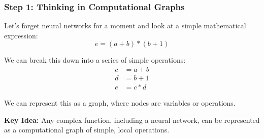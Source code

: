 \documentclass[xcolor=svgnames, 10pt, handout]{beamer}
\begin{document}
\begin{frame}
\frametitle{Step 1: Thinking in Computational Graphs}

Let's forget neural networks for a moment and look at a simple mathematical expression:
\begin{equation*}
    e = (a+b) * (b+1)
\end{equation*}

We can break this down into a series of simple operations:
\begin{align*}
    c &= a+b \\
    d &= b+1 \\
    e &= c * d
\end{align*}

We can represent this as a graph, where nodes are variables or operations.

\begin{center}
\end{center}

\textbf{Key Idea:} Any complex function, including a neural network, can be represented as a computational graph of simple, local operations.

\end{frame}
\end{document}
